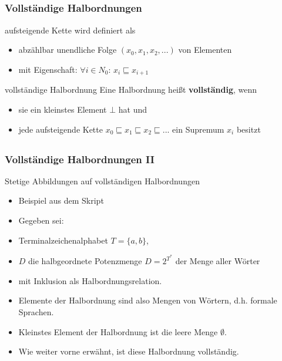 \subsection*{}
\begin{frame}
  \frametitle{Vollständige Halbordnungen}
  \begin{block}{aufsteigende Kette}
  wird definiert als
    \begin{itemize}
    \item abzählbar unendliche Folge $(x_0, x_1, x_2, ... )$ von Elementen
    \item mit Eigenschaft: $\forall i \in N_0$: $x_i \sqsubseteq x_{i+1}$
    \end{itemize}
	\end{block}
	\pause
	\begin{block}{vollständige Halbordnung}
    Eine Halbordnung heißt \textbf{vollständig}, wenn
    \begin{itemize}
    \item sie ein kleinstes Element $\bot$ hat und
    \item jede aufsteigende Kette $ x_0 \sqsubseteq x_1 \sqsubseteq x_2 \sqsubseteq ...$ ein Supremum $x_i$ besitzt
    \end{itemize}
	\end{block}
\end{frame}

\subsection*{}
\begin{frame}
  \frametitle{Vollständige Halbordnungen II}
  \begin{block}{Stetige Abbildungen auf vollständigen Halbordnungen}
    \begin{itemize}
    \item Beispiel aus dem Skript
    \item Gegeben sei:
    \item Terminalzeichenalphabet $T=\{a,b\}$, \pause
    \item $D$ die halbgeordnete Potenzmenge $D=2^{T^*}$ der Menge aller Wörter
    \item mit Inklusion als Halbordnungsrelation. \pause
    \item Elemente der Halbordnung sind also Mengen von Wörtern, d.h. formale Sprachen. \pause
    \item Kleinstes Element der Halbordnung ist die leere Menge $\emptyset$.  \pause
    \item Wie weiter vorne erwähnt, ist diese Halbordnung vollständig.
    \end{itemize}
	\end{block}
\end{frame}
